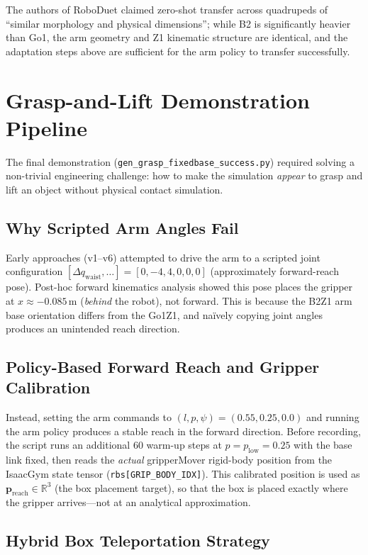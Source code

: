 The authors of RoboDuet claimed zero-shot transfer across quadrupeds of
``similar morphology and physical dimensions''; while B2 is significantly
heavier than Go1, the arm geometry and Z1 kinematic structure are identical,
and the adaptation steps above are sufficient for the arm policy to transfer
successfully.

\section{Grasp-and-Lift Demonstration Pipeline}
\label{sec:demo}

The final demonstration (\texttt{gen\_grasp\_fixedbase\_success.py}) required solving
a non-trivial engineering challenge: how to make the simulation \emph{appear}
to grasp and lift an object without physical contact simulation.

\subsection{Why Scripted Arm Angles Fail}

Early approaches (v1--v6) attempted to drive the arm to a scripted joint
configuration $[\Delta q_\text{waist},\ldots] = [0,-4,4,0,0,0]$
(approximately forward-reach pose).
Post-hoc forward kinematics analysis showed this pose places the gripper at
$x \approx -0.085$\,m (\emph{behind} the robot), not forward.
This is because the B2Z1 arm base orientation differs from the Go1Z1, and
na\"ively copying joint angles produces an unintended reach direction.

\subsection{Policy-Based Forward Reach and Gripper Calibration}

Instead, setting the arm commands to
$(l, p, \psi) = (0.55, 0.25, 0.0)$ and running the arm policy produces a
stable reach in the forward direction.
Before recording, the script runs an additional 60 warm-up steps at
$p = p_\text{low} = 0.25$ with the base link fixed, then reads the
\emph{actual} gripperMover rigid-body position from the IsaacGym state
tensor (\texttt{rbs[GRIP\_BODY\_IDX]}).
This calibrated position is used as
$\mathbf{p}_\text{reach} \in \mathbb{R}^3$ (the box placement target), so
that the box is placed exactly where the gripper arrives---not at an
analytical approximation.

\subsection{Hybrid Box Teleportation Strategy}

